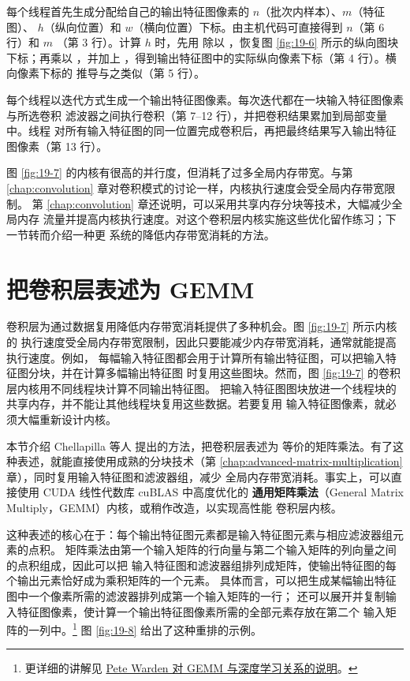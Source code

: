 每个线程首先生成分配给自己的输出特征图像素的 $n$（批次内样本）、$m$（特征图）、
$h$（纵向位置）和 $w$（横向位置）下标。由主机代码可直接得到 $n$（第 6 行）和 $m$
（第 3 行）。计算 $h$ 时，先用  除以 ，恢复图
\ref{fig:19-6} 所示的纵向图块下标；再乘以 ，并加上
，得到输出特征图中的实际纵向像素下标（第 4 行）。横向像素下标的
推导与之类似（第 5 行）。

每个线程以迭代方式生成一个输出特征图像素。每次迭代都在一块输入特征图像素与所选卷积
滤波器之间执行卷积（第 7--12 行），并把卷积结果累加到局部变量  中。线程
对所有输入特征图的同一位置完成卷积后，再把最终结果写入输出特征图像素（第 13 行）。

图 \ref{fig:19-7} 的内核有很高的并行度，但消耗了过多全局内存带宽。与第
\ref{chap:convolution} 章对卷积模式的讨论一样，内核执行速度会受全局内存带宽限制。
第 \ref{chap:convolution} 章还说明，可以采用共享内存分块等技术，大幅减少全局内存
流量并提高内核执行速度。对这个卷积层内核实施这些优化留作练习；下一节转而介绍一种更
系统的降低内存带宽消耗的方法。

\section{把卷积层表述为 GEMM}
\label{sec:cnn-as-gemm}

卷积层为通过数据复用降低内存带宽消耗提供了多种机会。图 \ref{fig:19-7} 所示内核的
执行速度受全局内存带宽限制，因此只要能减少内存带宽消耗，通常就能提高执行速度。例如，
每幅输入特征图都会用于计算所有输出特征图，可以把输入特征图分块，并在计算多幅输出特征图
时复用这些图块。然而，图 \ref{fig:19-7} 的卷积层内核用不同线程块计算不同输出特征图。
把输入特征图图块放进一个线程块的共享内存，并不能让其他线程块复用这些数据。若要复用
输入特征图像素，就必须大幅重新设计内核。

本节介绍 Chellapilla 等人\cite{ch19-chellapilla2006high} 提出的方法，把卷积层表述为
等价的矩阵乘法。有了这种表述，就能直接使用成熟的分块技术（第
\ref{chap:advanced-matrix-multiplication} 章），同时复用输入特征图和滤波器组，减少
全局内存带宽消耗。事实上，可以直接使用 CUDA 线性代数库 cuBLAS 中高度优化的
\textbf{通用矩阵乘法}（General Matrix Multiply，GEMM）内核，或稍作改造，以实现高性能
卷积层内核。

这种表述的核心在于：每个输出特征图元素都是输入特征图元素与相应滤波器组元素的点积。
矩阵乘法由第一个输入矩阵的行向量与第二个输入矩阵的列向量之间的点积组成，因此可以把
输入特征图和滤波器组排列成矩阵，使输出特征图的每个输出元素恰好成为乘积矩阵的一个元素。
具体而言，可以把生成某幅输出特征图中一个像素所需的滤波器排列成第一个输入矩阵的一行；
还可以展开并复制输入特征图像素，使计算一个输出特征图像素所需的全部元素存放在第二个
输入矩阵的一列中。\footnote{更详细的讲解见
\href{https://petewarden.com/2015/04/20/why-gemm-is-at-the-heart-of-deep-learning/}
{Pete Warden 对 GEMM 与深度学习关系的说明}。}
图 \ref{fig:19-8} 给出了这种重排的示例。

